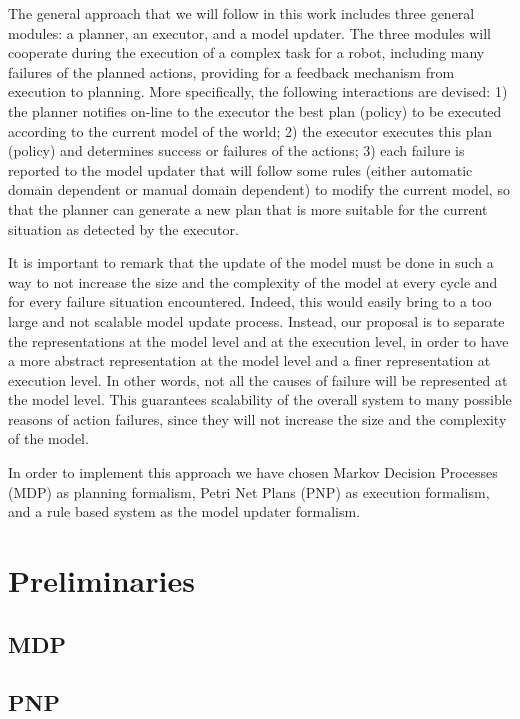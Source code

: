 The general approach that we will follow in this work includes three general modules: a planner, an executor, and a model updater. The three modules will cooperate during the execution of a complex task for a robot, including many failures of the planned actions, providing for a feedback mechanism from execution to planning.
More specifically, the following interactions are devised:
1) the planner notifies on-line to the executor the best plan (policy) to be executed according to the current model of the world; 2) the executor executes this plan (policy) and determines success or failures of the actions; 3) each failure is reported to the model updater that will follow some rules (either automatic domain dependent or manual domain dependent) to modify the current model, so that the planner can generate a new plan that is more suitable for the current situation as detected by the executor.

It is important to remark that the update of the model must be done in such a way to not increase the size and the complexity of the model at every cycle and for every failure situation encountered. Indeed, this would easily bring to a too large and not scalable model update process. Instead, our proposal is to separate the representations at the model level and at the execution level, in order to have a more abstract representation at the model level and a finer representation at execution level.
In other words, not all the causes of failure will be represented at the model level. This guarantees scalability of the overall system to many possible reasons of action failures,
since they will not increase the size and the complexity of the model.

In order to implement this approach we have chosen Markov Decision Processes (MDP) as planning formalism, Petri Net Plans (PNP) as execution formalism, and a rule based system as the model updater formalism.

\section{Preliminaries}

\subsection{MDP}

\subsection{PNP}

